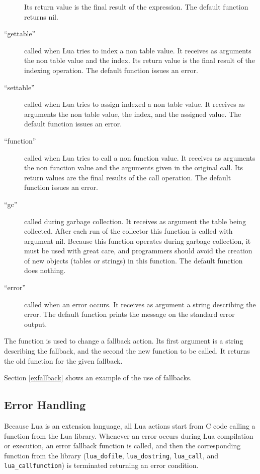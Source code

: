 \begin{description}
Its return value is the final result of the expression.
The default function returns nil.
\item[``gettable'']
called when Lua tries to index a non table value.
It receives as arguments the non table value and the index.
Its return value is the final result of the indexing operation.
The default function issues an error.
\item[``settable'']
called when Lua tries to assign indexed a non table value.
It receives as arguments the non table value,
the index, and the assigned value.
The default function issues an error.
\item[``function'']
called when Lua tries to call a non function value.
It receives as arguments the non function value and the
arguments given in the original call.
Its return values are the final results of the call operation.
The default function issues an error.
\item[``gc'']
called during garbage collection.
It receives as argument the table being collected.
After each run of the collector this function is called with argument nil.
Because this function operates during garbage collection,
it must be used with great care,
and programmers should avoid the creation of new objects
(tables or strings) in this function.
The default function does nothing.
\item[``error'']
called when an error occurs.
It receives as argument a string describing the error.
The default function prints the message on the standard error output.
\end{description}

The function  is used to change a fallback action.
Its first argument is a string describing the fallback,
and the second the new function to be called.
It returns the old function for the given fallback.

Section \ref{exfallback} shows an example of the use of fallbacks.


\subsection{Error Handling} \label{error}

Because Lua is an extension language,
all Lua actions start from C code calling a function from the Lua library.
Whenever an error occurs during Lua compilation or execution,
an error fallback function is called,
and then the corresponding function from the library
(\verb'lua_dofile', \verb'lua_dostring',
\verb'lua_call', and \verb'lua_callfunction')
is terminated returning an error condition.

